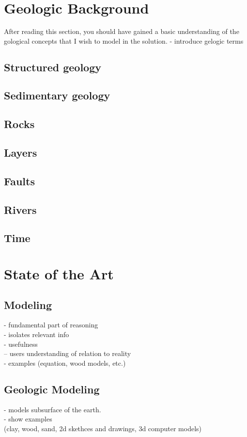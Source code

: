 \documentclass[a4paper,10pt]{article}
\begin{document}
\section{Geologic Background}
After reading this section, you should have gained a basic understanding of the gological concepts that I wish to model in the solution.
\label{sec:geology}
- introduce gelogic terms
\subsection{Structured geology}
\subsection{Sedimentary geology}
\subsection{Rocks}
\subsection{Layers}
\subsection{Faults}
\subsection{Rivers}
\subsection{Time}


\section{State of the Art}
\label{sec:star}
\subsection{Modeling}
- fundamental part of reasoning\\
- isolates relevant info\\
- usefulness\\
  -- users understanding of relation to reality\\
- examples (equation, wood models, etc.)

\subsection{Geologic Modeling}
- models subsurface of the earth.\\
- show examples\\(clay, wood, sand, 2d skethces and drawings, 3d computer models)
\end{document}
